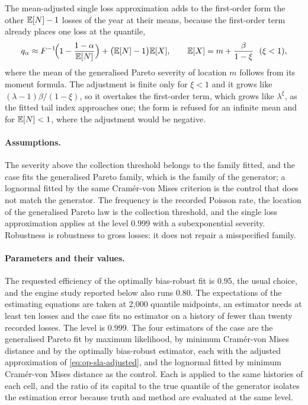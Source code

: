 The mean-adjusted single loss approximation adds to the first-order form the other $\mathbb{E}[N]-1$ losses of the year at their means,
because the first-order term already places one loss at the quantile,
\begin{equation}
q_\alpha\approx F^{-1}\!\Bigl(1-\frac{1-\alpha}{\mathbb{E}[N]}\Bigr)+\bigl(\mathbb{E}[N]-1\bigr)\mathbb{E}[X],\qquad \mathbb{E}[X]=m+\frac{\beta}{1-\xi}\ \ (\xi<1),
\label{eq:op-sla-adjusted}
\end{equation}
where the mean of the generalised Pareto severity of location $m$ follows from its moment formula. The adjustment is finite only for $\xi<1$ and it grows like $(\lambda-1)\beta/(1-\xi)$, so it overtakes the first-order term, which
grows like $\lambda^{\xi}$, as the fitted tail index approaches one; the form is refused for an infinite mean and for $\mathbb{E}[N]<1$, where the
adjustment would be negative.

\paragraph{Assumptions.} The severity above the collection threshold belongs to the family fitted, and the case fits the generalised Pareto family, which is
the family of the generator; a lognormal fitted by the same Cram\'er-von Mises criterion is the control that does not match the generator.
The frequency is the recorded Poisson rate, the location of the generalised Pareto law is the collection threshold, and the
single loss approximation applies at the level 0.999 with a subexponential severity. Robustness is robustness to gross losses: it does not repair a
misspecified family.

\paragraph{Parameters and their values.} The requested efficiency of the optimally bias-robust fit is 0.95, the usual choice, and the engine study reported below also
runs 0.80. The expectations of the estimating equations are taken at 2,000 quantile midpoints, an estimator needs at least ten losses and the case fits no estimator on
a history of fewer than twenty recorded losses. The level is 0.999. The four estimators of the case are the generalised Pareto fit by maximum
likelihood, by minimum Cram\'er-von Mises distance and by the optimally bias-robust estimator, each with the adjusted approximation of \cref{eq:op-sla-adjusted},
and the lognormal fitted by minimum Cram\'er-von Mises distance as the control. Each is applied to the same \opNRep{} histories of each cell, and the
ratio of its capital to the true quantile of the generator isolates the estimation error because truth and method are evaluated at the same level.

